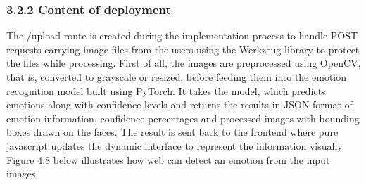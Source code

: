 \documentclass[a4paper,13pt]{report}
\begin{document}
\subsubsection{3.2.2 Content of deployment }
The /upload route is created during the implementation process to handle POST requests carrying image files from the users using the Werkzeug library to protect the files while processing. First of all, the images are preprocessed using OpenCV, that is, converted to grayscale or resized, before feeding them into the emotion recognition model built using PyTorch. It takes the model, which predicts emotions along with confidence levels and returns the results in JSON format of emotion information, confidence percentages and processed images with bounding boxes drawn on the faces. The result is sent back to the frontend where pure javascript updates the dynamic interface to represent the information visually. Figure 4.8 below illustrates how web can detect an emotion from the input images.

\FloatBarrier
\end{document}
